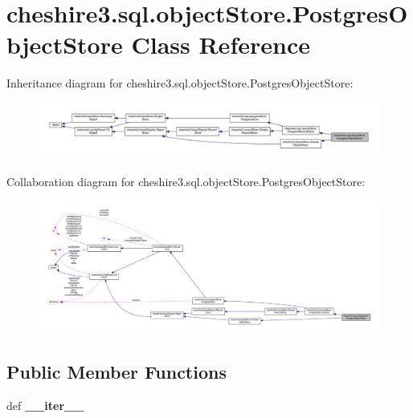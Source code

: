 \hypertarget{classcheshire3_1_1sql_1_1object_store_1_1_postgres_object_store}{\section{cheshire3.\-sql.\-object\-Store.\-Postgres\-Object\-Store Class Reference}
\label{classcheshire3_1_1sql_1_1object_store_1_1_postgres_object_store}
}


Inheritance diagram for cheshire3.\-sql.\-object\-Store.\-Postgres\-Object\-Store\-:
\nopagebreak
\begin{figure}[H]
\begin{center}
\leavevmode
\includegraphics[width=350pt]{classcheshire3_1_1sql_1_1object_store_1_1_postgres_object_store__inherit__graph}
\end{center}
\end{figure}


Collaboration diagram for cheshire3.\-sql.\-object\-Store.\-Postgres\-Object\-Store\-:
\nopagebreak
\begin{figure}[H]
\begin{center}
\leavevmode
\includegraphics[width=350pt]{classcheshire3_1_1sql_1_1object_store_1_1_postgres_object_store__coll__graph}
\end{center}
\end{figure}
\subsection*{Public Member Functions}
\begin{DoxyCompactItemize}
\item 
\hypertarget{classcheshire3_1_1sql_1_1object_store_1_1_postgres_object_store_a7170b9fe124a01d60cec314832c55c99}{def {\bfseries \-\_\-\-\_\-iter\-\_\-\-\_\-}}\label{classcheshire3_1_1sql_1_1object_store_1_1_postgres_object_store_a7170b9fe124a01d60cec314832c55c99}

\end{DoxyCompactItemize}
